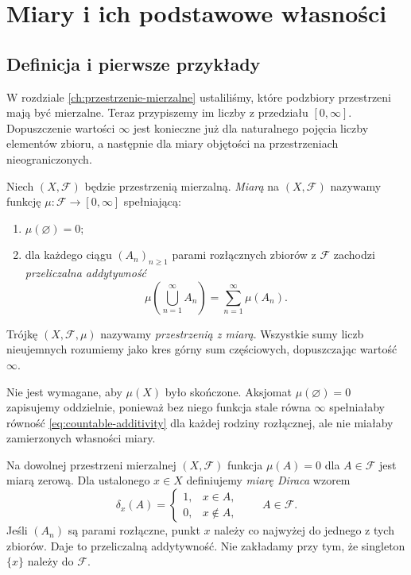 \chapter{Miary i ich podstawowe własności}
\label{ch:miary-wlasnosci}

\providecommand{\atlasref}[2]{#2}


\section{Definicja i pierwsze przykłady}

W rozdziale \ref{ch:przestrzenie-mierzalne} ustaliliśmy, które podzbiory
przestrzeni mają być mierzalne. Teraz przypiszemy im liczby z przedziału
$[0,\infty]$. Dopuszczenie wartości $\infty$ jest konieczne już dla
naturalnego pojęcia liczby elementów zbioru, a następnie dla miary
objętości na przestrzeniach nieograniczonych.

\begin{definicja}[Miara]
\label{def:measure}
Niech $(X,\mathcal F)$ będzie przestrzenią mierzalną.
\emph{Miarą} na $(X,\mathcal F)$ nazywamy funkcję
$\mu:\mathcal F\to[0,\infty]$ spełniającą:
\begin{enumerate}
\item $\mu(\varnothing)=0$;
\item dla każdego ciągu $(A_n)_{n\geq1}$ parami rozłącznych zbiorów
z $\mathcal F$ zachodzi \emph{przeliczalna addytywność}
\begin{equation}
\label{eq:countable-additivity}
\mu\left(\bigcup_{n=1}^{\infty}A_n\right)
=\sum_{n=1}^{\infty}\mu(A_n).
\end{equation}
\end{enumerate}
Trójkę $(X,\mathcal F,\mu)$ nazywamy \emph{przestrzenią z miarą}.
Wszystkie sumy liczb nieujemnych rozumiemy jako kres górny sum
częściowych, dopuszczając wartość $\infty$.
\end{definicja}

\begin{uwaga}
Nie jest wymagane, aby $\mu(X)$ było skończone. Aksjomat
$\mu(\varnothing)=0$ zapisujemy oddzielnie, ponieważ bez niego
funkcja stale równa $\infty$ spełniałaby równość
\eqref{eq:countable-additivity} dla każdej rodziny rozłącznej,
ale nie miałaby zamierzonych własności miary.
\end{uwaga}

\begin{przyklad}
\label{ex:dirac}
Na dowolnej przestrzeni mierzalnej $(X,\mathcal F)$ funkcja
$\mu(A)=0$ dla $A\in\mathcal F$ jest miarą zerową.
Dla ustalonego $x\in X$ definiujemy \emph{miarę Diraca} wzorem
\[
\delta_x(A)=\begin{cases}1,&x\in A,\\0,&x\notin A,\end{cases}
\qquad A\in\mathcal F.
\]
Jeśli $(A_n)$ są parami rozłączne, punkt $x$ należy co najwyżej
do jednego z tych zbiorów. Daje to przeliczalną addytywność.
Nie zakładamy przy tym, że singleton $\{x\}$ należy do $\mathcal F$.
\end{przyklad}

